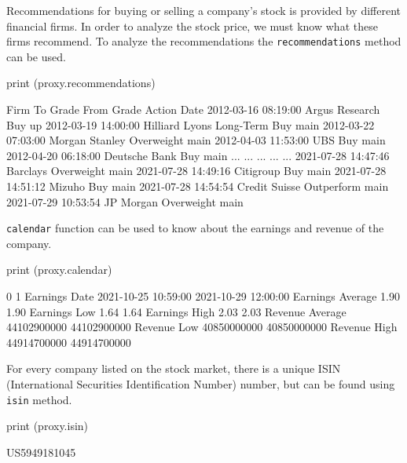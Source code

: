 Recommendations for buying or selling a company’s stock is provided by different financial firms. In order to analyze the stock price, we must know what these firms recommend. To analyze the recommendations the \texttt{recommendations} method can be used.

\begin{ipython}
print (proxy.recommendations)
\end{ipython}
\begin{ioutput}
                               Firm       To Grade From Grade Action
Date                                                                
2012-03-16 08:19:00  Argus Research            Buy                up
2012-03-19 14:00:00  Hilliard Lyons  Long-Term Buy              main
2012-03-22 07:03:00  Morgan Stanley     Overweight              main
2012-04-03 11:53:00             UBS            Buy              main
2012-04-20 06:18:00   Deutsche Bank            Buy              main
...                             ...            ...        ...    ...
2021-07-28 14:47:46        Barclays     Overweight              main
2021-07-28 14:49:16       Citigroup            Buy              main
2021-07-28 14:51:12          Mizuho            Buy              main
2021-07-28 14:54:54   Credit Suisse     Outperform              main
2021-07-29 10:53:54       JP Morgan     Overweight              main
\end{ioutput}

\texttt{calendar} function can be used to know about the earnings and revenue of the company.

\begin{ipython}
print (proxy.calendar)
\end{ipython}
\begin{ioutput}
                                    0                    1
Earnings Date     2021-10-25 10:59:00  2021-10-29 12:00:00
Earnings Average                 1.90                 1.90
Earnings Low                     1.64                 1.64
Earnings High                    2.03                 2.03
Revenue Average           44102900000          44102900000
Revenue Low               40850000000          40850000000
Revenue High              44914700000          44914700000
\end{ioutput}

For every company listed on the stock market, there is a unique ISIN (International Securities Identification Number) number, but can be found using \texttt{isin} method.

\begin{ipython}
print (proxy.isin)
\end{ipython}
\begin{ioutput}
US5949181045
\end{ioutput}

